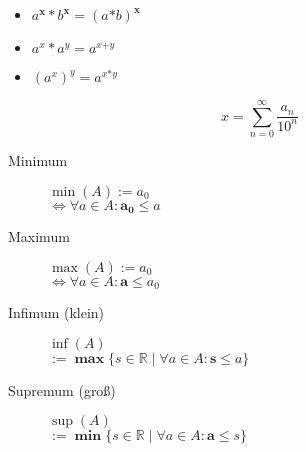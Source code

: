 \documentclass[uniLeipzig]{merkzettel}
\begin{document}
\begin{mzImportant}
  \begin{itemize}
    \item $a^{\mathbf{x}} * b^{\mathbf{x}} = (a \mathbf{*} b)^{\mathbf{x}}$

    \item $a^x * a^y = a^{x \boldsymbol{+} y}$

    \item $(a^x)^y = a^{x \boldsymbol{*} y}$

  \end{itemize}
\end{mzImportant}

\begin{mzImportant}
  $$x = \sum_{n = 0}^\infty \frac{a_n}{10^n}$$
\end{mzImportant}

\begin{mzImportant}
  \begin{description}
    \item [Minimum]
          $\min(A) := a_0$ \\
          $\Leftrightarrow \forall a \in A: \mathbf{a_0} \boldsymbol{\leq} a$

    \item [Maximum]
          $\max(A) := a_0$ \\
          $\Leftrightarrow \forall a \in A: \mathbf{a} \boldsymbol{\leq} a_0$
  \end{description}
\end{mzImportant}

\begin{mzImportant}
  \begin{description}
    \item [Infimum (klein)] $\inf(A)$ \\
          $:= \mathbf{\max} \{ s \in \mathbb{R} \mid \forall a \in A: \mathbf{s} \boldsymbol{\leq} a \}$

    \item [Supremum (gro\ss)] $\sup(A)$ \\
          $:= \mathbf{\min} \{ s \in \mathbb{R} \mid \forall a \in A: \mathbf{a} \boldsymbol{\leq} s \}$
  \end{description}
\end{mzImportant}
\end{document}
